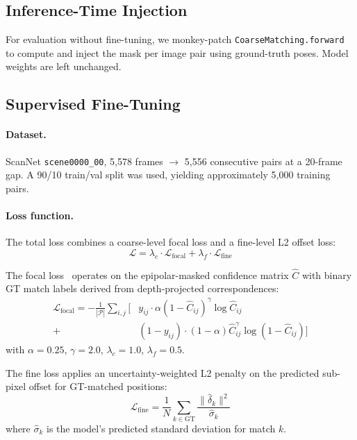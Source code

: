 \documentclass[10pt]{article}
\begin{document}
\subsection{Inference-Time Injection}

For evaluation without fine-tuning, we monkey-patch \texttt{CoarseMatching.forward} to compute and inject the mask per image pair using ground-truth poses. Model weights are left unchanged.

\subsection{Supervised Fine-Tuning}

\paragraph{Dataset.} ScanNet \texttt{scene0000\_00}, 5,578 frames $\to$ 5,556 consecutive pairs at a 20-frame gap. A 90/10 train/val split was used, yielding approximately 5,000 training pairs.

\paragraph{Loss function.} The total loss combines a coarse-level focal loss and a fine-level L2 offset loss:
\begin{equation}
    \mathcal{L} = \lambda_c \cdot \mathcal{L}_{\text{focal}} + \lambda_f \cdot \mathcal{L}_{\text{fine}}
\end{equation}

The focal loss~\cite{focalloss} operates on the epipolar-masked confidence matrix $\hat{C}$ with binary GT match labels derived from depth-projected correspondences:
\begin{align}
    \mathcal{L}_{\text{focal}} = -\frac{1}{|\mathcal{P}|} \sum_{i,j} \Big[
        &y_{ij} \cdot \alpha (1 - \hat{C}_{ij})^\gamma \log \hat{C}_{ij} \nonumber \\
        + &(1-y_{ij}) \cdot (1-\alpha) \hat{C}_{ij}^\gamma \log(1 - \hat{C}_{ij}) \Big]
\end{align}
with $\alpha = 0.25$, $\gamma = 2.0$, $\lambda_c = 1.0$, $\lambda_f = 0.5$.

The fine loss applies an uncertainty-weighted L2 penalty on the predicted sub-pixel offset for GT-matched positions:
\begin{equation}
    \mathcal{L}_{\text{fine}} = \frac{1}{N} \sum_{k \in \text{GT}} \frac{\|\hat{\delta}_k\|^2}{\hat{\sigma}_k}
\end{equation}
where $\hat{\sigma}_k$ is the model's predicted standard deviation for match $k$.
\end{document}
